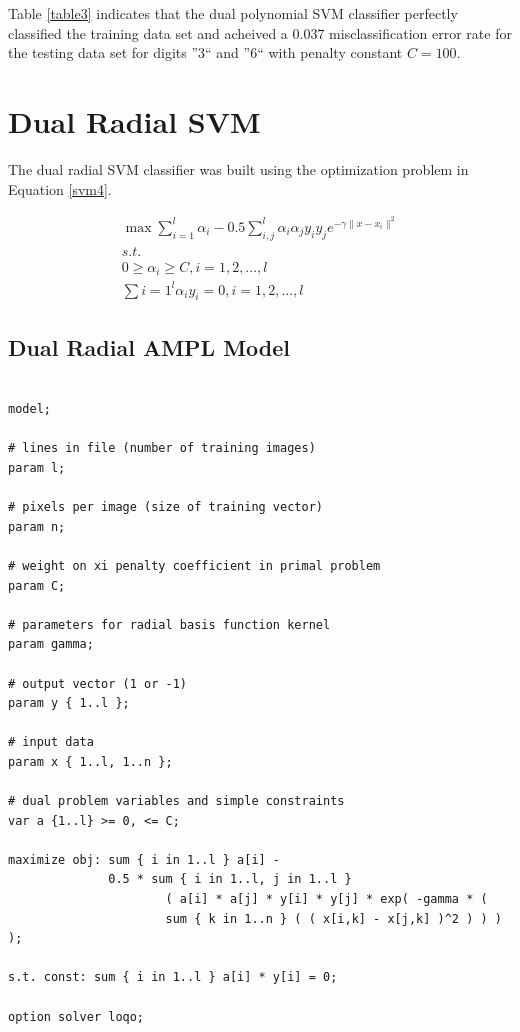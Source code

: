 \documentclass{article}
\begin{document}
Table \ref{table3} indicates that the dual polynomial SVM classifier perfectly classified the training data set and acheived a \(0.037\) misclassification error rate for the testing data set for digits ''3`` and ''6`` with penalty constant \(C=100\).

\section{Dual Radial SVM}\label{model4}

The dual radial SVM classifier was built using the optimization problem in Equation \ref{svm4}.

\begin{equation}
\begin{split}
\max \sum_{i=1}^l \alpha_i - 0.5 \sum_{i,j}^l \alpha_i \alpha_j y_i y_j e^{-\gamma \| x - x_i \|^2 } \\
s.t. \\
0 \ge \alpha_i \ge C , i = 1,2,...,l \\
\sum{i=1}^l \alpha_i y_i = 0 , i = 1,2,...,l
\end{split}
\label{svm4}
\end{equation}

\subsection{Dual Radial AMPL Model}

\begin{verbatim}

model;

# lines in file (number of training images)
param l;

# pixels per image (size of training vector)
param n;

# weight on xi penalty coefficient in primal problem
param C;

# parameters for radial basis function kernel
param gamma;

# output vector (1 or -1)
param y { 1..l };

# input data
param x { 1..l, 1..n };

# dual problem variables and simple constraints
var a {1..l} >= 0, <= C;

maximize obj: sum { i in 1..l } a[i] -
              0.5 * sum { i in 1..l, j in 1..l }
                      ( a[i] * a[j] * y[i] * y[j] * exp( -gamma * ( 
                      sum { k in 1..n } ( ( x[i,k] - x[j,k] )^2 ) ) ) );

s.t. const: sum { i in 1..l } a[i] * y[i] = 0;

option solver loqo;

\end{verbatim}
\end{document}
